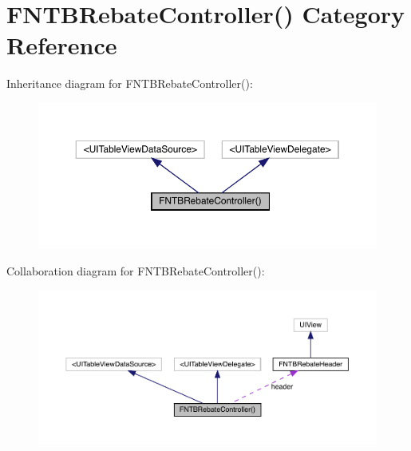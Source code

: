 \hypertarget{category_f_n_t_b_rebate_controller_07_08}{}\section{F\+N\+T\+B\+Rebate\+Controller() Category Reference}
\label{category_f_n_t_b_rebate_controller_07_08}


Inheritance diagram for F\+N\+T\+B\+Rebate\+Controller()\+:\nopagebreak
\begin{figure}[H]
\begin{center}
\leavevmode
\includegraphics[width=350pt]{category_f_n_t_b_rebate_controller_07_08__inherit__graph}
\end{center}
\end{figure}


Collaboration diagram for F\+N\+T\+B\+Rebate\+Controller()\+:\nopagebreak
\begin{figure}[H]
\begin{center}
\leavevmode
\includegraphics[width=350pt]{category_f_n_t_b_rebate_controller_07_08__coll__graph}
\end{center}
\end{figure}
